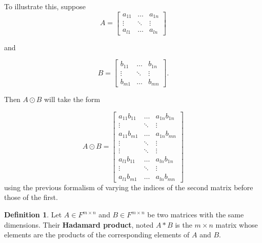 \documentclass{report}
\theoremstyle{definition}
\newtheorem{defin}{Definition}
\theoremstyle{remark}
\begin{document}
To illustrate this, suppose
\begin{equation*}
        A = \begin{bmatrix}
                a_{11} & \dots & a_{1n} \\
                \vdots & \ddots & \vdots \\
                a_{l1} & \dots & a_{ln} 
        \end{bmatrix}
\end{equation*}

and

\begin{equation*}
        B = \begin{bmatrix}
                b_{11} & \dots & b_{1n} \\
                \vdots & \ddots & \vdots \\
                b_{m1} & \dots & b_{mn}
        \end{bmatrix}.
\end{equation*}

Then $A \odot B$ will take the form

\begin{equation*}
        A \odot B = \begin{bmatrix}
                a_{11} b_{11} & \dots & a_{1n}b_{1n} \\
                \vdots & \ddots & \vdots \\
                a_{11} b_{m1} & \dots & a_{1n}b_{mn} \\
                \vdots & \ddots & \vdots \\
                \vdots & \ddots & \vdots \\
                a_{l1} b_{11} & \dots & a_{ln} b_{1n} \\
                \vdots & \ddots & \vdots \\
                a_{l1} b_{m1} & \dots & a_{ln} b_{mn}
                \end{bmatrix}
\end{equation*}
using the previous formalism of varying the indices of the second matrix before those of the first.


\begin{defin}
        Let $A \in F^{m \times n}$ and $B \in F^{m \times n}$ be two matrices with the same dimensions. Their \textbf{Hadamard product}, noted $A \ast B$ is the $m \times n$ matrix whose elements are the products of the corresponding elements of $A$ and $B$.
\end{defin}
\end{document}
